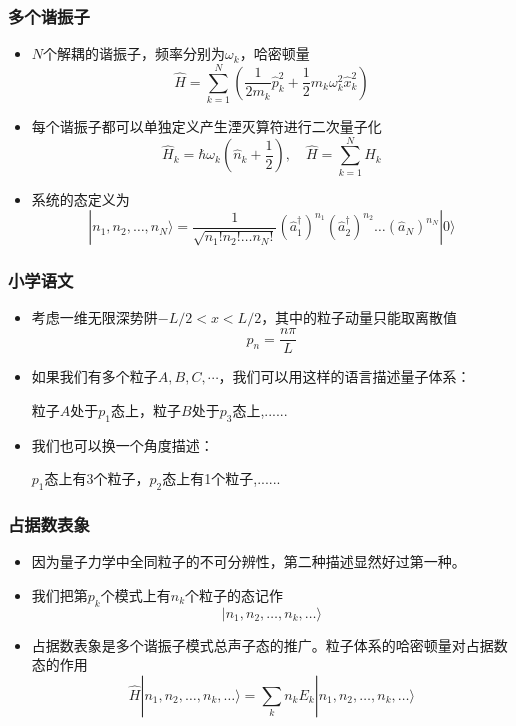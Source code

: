 \documentclass[aspectratio=1610,14pt,mathserif]{beamer}
\newcommand{\bch}{}
\newcommand{\ech}{}
\newcommand{\red}[1]{{\color{red} #1}}
\newcommand{\blue}[1]{{\color{blue} #1}}
\begin{document}
\begin{frame}
\frametitle{\bch 多个谐振子 \ech}
\bch
\begin{itemize}
\item $N$个解耦的谐振子，频率分别为$\omega_k$，哈密顿量
$$
\hat{H} = \sum_{k=1}^N (\frac{1}{2m_k} \hat{p}_k^2 + \frac{1}{2} m_k \omega_k^2 \hat{x}_k^2)
$$
\item 每个谐振子都可以单独定义产生湮灭算符进行二次量子化
$$
\hat{H}_k = \hbar \omega_k (\hat{n}_k + \frac{1}{2}) ,\quad \hat{H} = \sum_{k=1}^N \hat{H}_k
$$
\item 系统的态定义为
$$
|n_1,n_2,\dots,n_N\rangle = \frac{1}{\sqrt{n_1! n_2! \dots n_N!}} (\hat{a}_1^\dagger)^{n_1} (\hat{a}_2^\dagger)^{n_2}\dots(\hat{a}_N)^{n_N}|0\rangle
$$
\end{itemize}
\ech
\end{frame}


\begin{frame}
\frametitle{\bch 小学语文 \ech}
\bch
\begin{itemize}
\item 考虑一维无限深势阱$-L/2<x<L/2$，其中的粒子动量只能取离散值
$$
p_n = \frac{n\pi}{L}
$$
\item 如果我们有多个粒子$A,B,C,\cdots$，我们可以用这样的语言描述量子体系：
\begin{center}
\red{粒子$A$处于$p_1$态上，粒子$B$处于$p_3$态上,......}
\end{center}
\item 我们也可以换一个角度描述：
\begin{center}
\blue{$p_1$态上有3个粒子，$p_2$态上有1个粒子,......}
\end{center}
\end{itemize}
\ech
\end{frame}

\begin{frame}
\frametitle{\bch 占据数表象 \ech}
\bch
\begin{itemize}
\item 因为量子力学中全同粒子的不可分辨性，第二种描述显然好过第一种。
\item 我们把第$p_k$个模式上有$n_k$个粒子的态记作
$$
|n_1,n_2,\dots,n_k,\dots\rangle
$$
\item 占据数表象是多个谐振子模式总声子态的推广。粒子体系的哈密顿量对占据数态的作用
$$
\hat H |n_1,n_2,\dots,n_k,\dots\rangle = \sum_k n_k E_k |n_1,n_2,\dots,n_k,\dots\rangle
$$
\end{itemize}
\ech
\end{frame}
\end{document}

